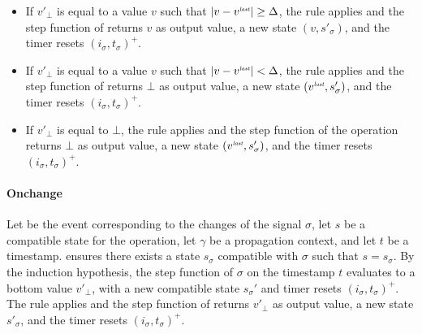 \begin{skippableproof}
    \begin{itemize}
        \item If $v'_\bot$ is equal to a value $v$ such that $|v - v^{\textit{\tiny last}}| \ge \Delta$, the rule
               applies and the step function
              of \throttle{\sigma}{\Delta} returns $v$ as output value, a new state $(v, s'_\sigma)
              $, and the timer resets $(i_\sigma, t_\sigma)^+$.

        \item If $v'_\bot$ is equal to a value $v$ such that $|v - v^{\textit{\tiny last}}| < \Delta$, the rule
               applies and the step function
              of \throttle{\sigma}{\Delta} returns $\bot$ as output value, a new state $(v^{\textit{\tiny last}},
                  s'_\sigma)$, and the timer resets $(i_\sigma, t_\sigma)^+$.

        \item If $v'_\bot$ is equal to $\bot$, the rule  applies and the step function of the operation \throttle{\sigma}
              {\Delta} returns $\bot$ as output value, a new state $(v^{\textit{\tiny last}}, s'_\sigma)$, and
              the timer resets $(i_\sigma, t_\sigma)^+$.
    \end{itemize}

    \paragraph{Onchange}
    Let \onchange{\sigma} be the event corresponding to the changes of the signal $\sigma$, let $s$
    be a compatible state for the operation, let $\gamma$ be a propagation context, and let $t$ be a
    timestamp.
     ensures there exists a state $s_\sigma$
    compatible with $\sigma$ such that $s = s_\sigma$.
    By the induction hypothesis, the step function of $\sigma$ on the timestamp $t$ evaluates to a
    bottom value $v'_\bot$, with a new compatible state $s_\sigma'$ and timer resets $(i_\sigma,
        t_\sigma)^+$.
    The rule  applies and the step function of
    \onchange{\sigma} returns $v'_\bot$ as output value, a new state $s'_\sigma$, and the timer
    resets $(i_\sigma, t_\sigma)^+$.


\end{skippableproof}

